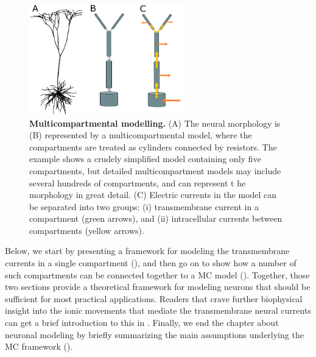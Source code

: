 \begin{figure}[!ht]
\begin{center}
\includegraphics[width=0.6\textwidth]{Figures/Neuron/multicompartment.png}
\end{center}
\caption{\textbf{Multicompartmental modelling.}  (A) The neural morphology is (B) represented by a multicompartmental model, where the compartments are treated as cylinders connected by resistors. The example shows a crudely simplified model containing only five compartments, but detailed multicompartment models may include several hundreds of compartments, and can represent t he morphology in great detail. (C) Electric currents in the model can be separated into two groups: (i) transmembrane current in a compartment (green arrows), and (ii) intracellular currents between compartments (yellow arrows). 
}
\label{fig:Neuron:multicomp}
\end{figure}

Below, we start by presenting a framework for modeling the transmembrane currents in a single compartment (), and then go on to show how a number of such compartments can be connected together to a MC model (). Together, those two sections provide a theoretical framework for modeling neurons that should be sufficient for most practical applications. Readers that crave further biophysical insight into the ionic movements that mediate the transmembrane neural currents can get a brief introduction to this in . Finally, we end the chapter about neuronal modeling by briefly summarizing the main assumptions underlying the MC framework ().


